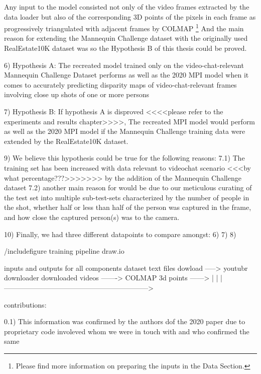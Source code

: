 Any input to the model consisted not only of the video frames extracted by the data loader but also of the corresponding 3D points of the pixels in each frame as progressively triangulated with adjacent frames by COLMAP \footnote{Please find more information on preparing the inputs in the Data Section.}
And the main reason for extending the Mannequin Challenge dataset with the originally used RealEstate10K dataset was so the Hypothesis B of this thesis could be proved.


6) Hypothesis A: The recreated model trained only on the video-chat-relevant Mannequin Challenge Dataset performs as well as the 2020 MPI model when it comes to accurately predicting disparity maps of video-chat-relevant frames involving close up shots of one or more persons

7) Hypothesis B: If hypothesis A is disproved <<<<please refer to the experiments and results chapter>>>>, The recreated MPI model would perform as well as the 2020 MPI model if the Mannequin Challenge training data were extended by the RealEstate10K dataset.


9) We believe this hypothesis could be true for the following reasons: 
    7.1) The training set has been increased with data relevant to videochat scenario <<<by what percentage???>>>>>>> by the addition of the Mannequin Challenge dataset
    7.2) another main reason for would be due to our meticulous curating of the test set into multiple sub-test-sets characterized by the number of people in the shot, whether half or less than half of the person was captured in the frame, and how close the captured person(s) was to the camera.

10) Finally, we had three different datapoints to compare amongst: 6) 7) 8)



 
/include{figure} training pipeline 
draw.io


inputs and outputs for all components 
dataset text files dowload -----> youtubr downloader downloaded videos -------> COLMAP 3d points ------> 
                                        |
                                        |
                                        |-------------------------------------------------------------->

contributions:







    0.1) This information was confirmed by the authors dof the 2020 paper due to proprietary code involeved whom we were in touch with and who confirmed the same
   
